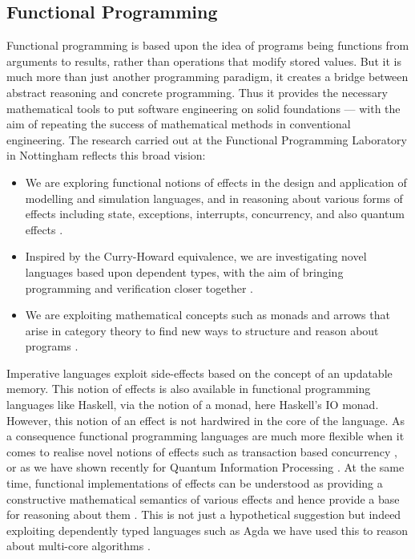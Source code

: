 \documentclass[a4paper]{article}
\begin{document}
\subsection*{Functional Programming}
Functional programming is based upon the idea of programs being
functions from arguments to results, rather than operations that
modify stored values.  But it is much more than just another
programming paradigm, it creates a bridge between abstract reasoning and
concrete programming. Thus it provides the necessary mathematical tools
to put software engineering on solid foundations --- with the aim of
repeating the success of mathematical methods in conventional
engineering.  The research carried out at the Functional Programming
Laboratory in Nottingham reflects this broad vision:
\begin{itemize}
\item We are exploring functional notions of effects in the design and
  application of modelling and simulation languages, and in reasoning
  about various forms of effects including state, exceptions,
  interrupts, concurrency, and also quantum effects
   .
\item Inspired by the Curry-Howard equivalence, we are investigating
  novel languages based upon dependent types, with the aim of bringing
  programming and verification closer together .
\item We are exploiting mathematical concepts such as monads and
  arrows that arise in category theory to find new ways to structure
  and reason about programs .
\end{itemize}
Imperative languages exploit side-effects based on the concept of an
updatable memory. This notion of effects is also available in
functional programming languages like Haskell, via the notion of a
monad, here Haskell's IO monad. However, this notion of an effect is
not hardwired in the core of the language. As a consequence functional
programming languages are much more flexible when it comes to realise
novel notions of effects such as transaction based concurrency 
,
or as we have shown recently for Quantum Information Processing .
At the same time, functional implementations of effects can be
understood as providing a constructive mathematical semantics of
various effects and hence provide a base for reasoning about them
. 
This is not just a hypothetical suggestion
but indeed exploiting dependently typed languages such as Agda we have
used this to reason about multi-core algorithms .  
\end{document}
